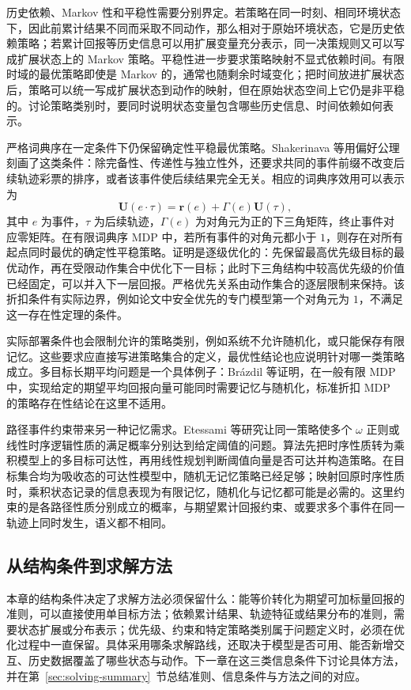 历史依赖、Markov 性和平稳性需要分别界定。若策略在同一时刻、相同环境状态下，因此前累计结果不同而采取不同动作，那么相对于原始环境状态，它是历史依赖策略；若累计回报等历史信息可以用扩展变量充分表示，同一决策规则又可以写成扩展状态上的 Markov 策略。平稳性进一步要求策略映射不显式依赖时间。有限时域的最优策略即使是 Markov 的，通常也随剩余时域变化；把时间放进扩展状态后，策略可以统一写成扩展状态到动作的映射，但在原始状态空间上它仍是非平稳的\cite{bauerle2014}。讨论策略类别时，要同时说明状态变量包含哪些历史信息、时间依赖如何表示。

严格词典序在一定条件下仍保留确定性平稳最优策略。Shakerinava 等用偏好公理刻画了这类条件：除完备性、传递性与独立性外，还要求共同的事件前缀不改变后续轨迹彩票的排序，或者该事件使后续结果完全无关。相应的词典序效用可以表示为
\begin{equation}
\mathbf U(e\cdot\tau)=\mathbf r(e)+\Gamma(e)\mathbf U(\tau),
\end{equation}
其中 $e$ 为事件，$\tau$ 为后续轨迹，$\Gamma(e)$ 为对角元为正的下三角矩阵，终止事件对应零矩阵\cite{shakerinava2025lex}。在有限词典序 MDP 中，若所有事件的对角元都小于 $1$，则存在对所有起点同时最优的确定性平稳策略。证明是逐级优化的：先保留最高优先级目标的最优动作，再在受限动作集合中优化下一目标；此时下三角结构中较高优先级的价值已经固定，可以并入下一层回报。严格优先关系由动作集合的逐层限制来保持。该折扣条件有实际边界，例如论文中安全优先的专门模型第一个对角元为 $1$，不满足这一存在性定理的条件。

实际部署条件也会限制允许的策略类别，例如系统不允许随机化，或只能保存有限记忆。这些要求应直接写进策略集合的定义，最优性结论也应说明针对哪一类策略成立。多目标长期平均问题是一个具体例子：Brázdil 等证明，在一般有限 MDP 中，实现给定的期望平均回报向量可能同时需要记忆与随机化\cite{brazdil2014}，标准折扣 MDP 的策略存在性结论在这里不适用。

路径事件约束带来另一种记忆需求。Etessami 等研究让同一策略使多个 $\omega$ 正则或线性时序逻辑性质的满足概率分别达到给定阈值的问题\cite{etessami2008modelchecking}。算法先把时序性质转为乘积模型上的多目标可达性，再用线性规划判断阈值向量是否可达并构造策略。在目标集合均为吸收态的可达性模型中，随机无记忆策略已经足够；映射回原时序性质时，乘积状态记录的信息表现为有限记忆，随机化与记忆都可能是必需的。这里约束的是各路径性质分别成立的概率，与期望累计回报约束、或要求多个事件在同一轨迹上同时发生，语义都不相同。

\subsection{从结构条件到求解方法}\label{sec:structure-to-solving}

本章的结构条件决定了求解方法必须保留什么：能等价转化为期望可加标量回报的准则，可以直接使用单目标方法；依赖累计结果、轨迹特征或结果分布的准则，需要状态扩展或分布表示；优先级、约束和特定策略类别属于问题定义时，必须在优化过程中一直保留。具体采用哪条求解路线，还取决于模型是否可用、能否新增交互、历史数据覆盖了哪些状态与动作。下一章在这三类信息条件下讨论具体方法，并在第~\ref{sec:solving-summary}~节总结准则、信息条件与方法之间的对应。

